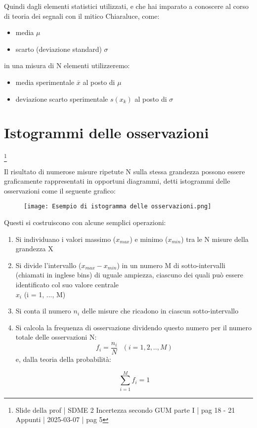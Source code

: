 Quindi dagli elementi statistici utilizzati, e che hai imparato a conoscere al corso di teoria dei segnali con il mitico Chiaraluce, come: 

\begin{itemize}
    \item media $\mu$ 
    \item scarto (deviazione standard) $\sigma$
\end{itemize}

in una misura di N elementi utilizzeremo: 

\begin{itemize}
    \item media sperimentale $\overline{x}$ al posto di $\mu$ 
    \item deviazione scarto sperimentale $s(x_k)$ al posto di $\sigma$
\end{itemize}

\newpage 

\section{Istogrammi delle osservazioni}
\footnote{Slide della prof | SDME 2 Incertezza secondo GUM parte I | pag 18 - 21 \\  
Appunti | 2025-03-07 | pag 5}

Il risultato di numerose misure ripetute N sulla stessa grandezza 
possono essere graficamente rappresentati in opportuni diagrammi, 
detti istogrammi delle osservazioni come il seguente grafico: 

\begin{figure}[h]
    \centering
    \texttt{[image: Esempio di istogramma delle osservazioni.png]}
\end{figure}

Questi si costruiscono con alcune semplici operazioni: 

\begin{enumerate}
    \item Si individuano i valori massimo ($x_{max}$) e minimo ($x_{min}$) tra le N misure della grandezza X 
    \item Si divide l'intervallo ($x_{max} - x_{min}$) in un numero M di sotto-intervalli (chiamati in inglese bins) di uguale ampiezza, ciascuno dei quali può essere identificato col suo valore centrale \\ $x_i$ (i = 1, ..., M) 
    \item Si conta il numero $n_i$ delle misure che ricadono in ciascun sotto-intervallo 
    \item Si calcola la frequenza di osservazione dividendo questo numero per il numero totale delle osservazioni N: 
    {
        \Large 
        \begin{equation}
            f_i = \frac{n_i}{N} \text{ } (i = 1, 2, .., M)
        \end{equation}
    } 
    e, dalla teoria della probabilità: 

    {
        \Large 
        \begin{equation}
            \sum_{i=1}^{M}
            f_i 
            = 
            1
        \end{equation}
    }
\end{enumerate}

